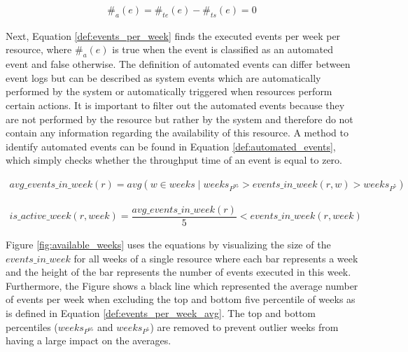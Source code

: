 \begin{equation}\label{def:automated_events}
  \begin{array}{l}
    \#_{a}(e) = \#_{te}(e) - \#_{ts}(e) = 0
  \end{array}
\end{equation}

Next, Equation \ref{def:events_per_week} finds the executed events per week per resource, where $\#_{a}(e)$ is true when the event is classified as an automated event and false otherwise. The definition of automated events can differ between event logs but can be described as system events which are automatically performed by the system or automatically triggered when resources perform certain actions. It is important to filter out the automated events because they are not performed by the resource but rather by the system and therefore do not contain any information regarding the availability of this resource. A method to identify automated events can be found in Equation \ref{def:automated_events}, which simply checks whether the throughput time of an event is equal to zero. 

\begin{equation}\label{def:events_per_week_avg}
  \begin{array}{l}
    avg\_events\_in\_week(r) = avg(w  \in weeks \; | \; weeks_{P^{95}} > events\_in\_week(r, w) > weeks_{P^{5}})
  \end{array}
\end{equation}

\begin{equation}\label{def:active_week}
  \begin{array}{l}
    is\_active\_week(r, week) = \dfrac{avg\_events\_in\_week(r)}{5} < events\_in\_week(r, week)
  \end{array}
\end{equation}

Figure \ref{fig:available_weeks} uses the equations by visualizing the size of the $events\_in\_week$ for all weeks of a single resource where each bar represents a week and the height of the bar represents the number of events executed in this week. Furthermore, the Figure shows a black line which represented the average number of events per week when excluding the top and bottom five percentile of weeks as is defined in Equation \ref{def:events_per_week_avg}. The top and bottom percentiles ($weeks_{P^{95}}$ and $weeks_{P^{5}}$) are removed to prevent outlier weeks from having a large impact on the averages.

